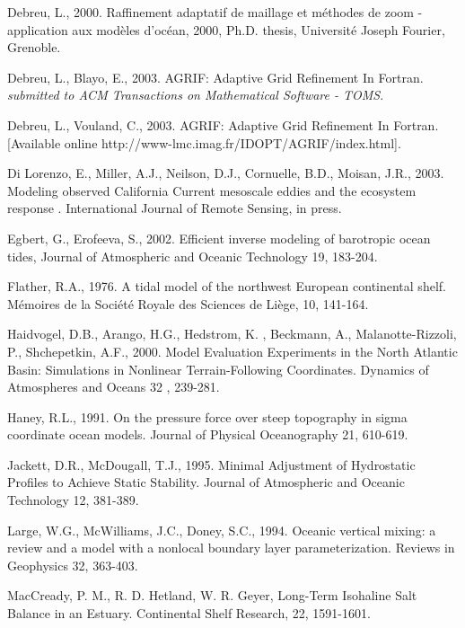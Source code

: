 Debreu, L.,
2000.
Raffinement adaptatif de maillage et m\'ethodes de zoom -
application aux mod\`eles d'oc\'ean,
2000,
Ph.D. thesis,
Universit\'e Joseph Fourier,
Grenoble.

Debreu, L., Blayo, E.,
2003.
AGRIF: Adaptive Grid Refinement In Fortran.
{\it submitted to ACM Transactions on Mathematical Software - TOMS}.

Debreu, L., Vouland, C.,
2003.
AGRIF: Adaptive Grid Refinement In Fortran.
[Available online http://www-lmc.imag.fr/IDOPT/AGRIF/index.html].

Di Lorenzo, E., Miller, A.J., Neilson, D.J., 
Cornuelle, B.D., Moisan, J.R.,
2003.
Modeling observed California Current mesoscale eddies and 
the ecosystem response .
International Journal of Remote Sensing,
in press.

Egbert, G., Erofeeva, S., 2002.
Efficient inverse modeling of barotropic ocean tides, 
Journal of Atmospheric and Oceanic Technology
19,
183-204.

Flather, R.A., 1976.
A tidal model of the northwest European continental shelf.
M\'emoires de la Soci\'et\'e Royale des Sciences de Li\`ege, 
10, 
141-164.

Haidvogel, D.B., Arango, H.G., Hedstrom, K. , Beckmann, A.,
Malanotte-Rizzoli, P., Shchepetkin, A.F.,
2000.
Model Evaluation Experiments in the North Atlantic Basin:
Simulations in Nonlinear Terrain-Following Coordinates.
Dynamics of Atmospheres and Oceans
32 ,
239-281.

Haney, R.L.,
1991.
On the pressure force over steep
topography in sigma coordinate ocean models.
Journal of Physical Oceanography
21,
610-619.

Jackett, D.R., McDougall, T.J.,
1995.
Minimal Adjustment of Hydrostatic Profiles to 
Achieve Static Stability.
Journal of Atmospheric and Oceanic Technology
12,
381-389.

Large, W.G., McWilliams, J.C., Doney, S.C.,
1994.
Oceanic vertical mixing: a review and a model
with a nonlocal boundary layer parameterization.
Reviews in Geophysics
32,
363-403.

MacCready, P. M., R. D. Hetland, W. R. Geyer, 
Long-Term Isohaline Salt Balance in an Estuary. 
Continental Shelf Research, 22, 1591-1601.

